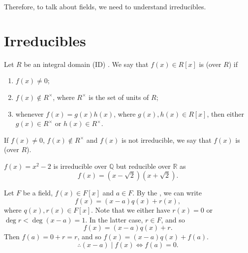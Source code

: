 \documentclass[notoc,notitlepage]{tufte-book}
\begin{document}
Therefore, to talk about fields, we need to understand irreducibles.


\section{Irreducibles}%
\label{sec:irreducibles}

\begin{defn}[Irreducible]\label{defn:irreducible}
  Let $R$ be an integral domain (ID) . We say that $f(x) \in R[x]$ is 
  (over $R$) if
  \begin{enumerate}
    \item $f(x) \neq 0$;
    \item $f(x) \notin R^\times$, where $R^\times$ is the set of units of $R$;
    \item whenever $f(x) = g(x) h(x)$, where $g(x), h(x) \in R[x]$, then either 
      $g(x) \in R^\times$ or $h(x) \in R^\times$.
  \end{enumerate}
  If $f(x) \neq 0$, $f(x) \notin R^\times$ and $f(x)$ is not irreducible, we say that
  $f(x)$ is  (over $R$).
\end{defn}

\begin{eg}
  $f(x) = x^2 - 2$ is irreducible over $\mathbb{Q}$ but reducible over $\mathbb{R}$ as
  \begin{equation*}
    f(x) = \left(x - \sqrt{2}\right)\left(x + \sqrt{2}\right).
  \end{equation*}
\end{eg}

Let $F$ be a field, $f(x) \in F[x]$ and $a \in F$. By the ,
we can write
\begin{equation*}
  f(x) = (x - a) q(x) + r(x),
\end{equation*}
where $q(x), r(x) \in F[x]$. Note that we either have $r(x) = 0$ or 
$\deg r < \deg (x - a) = 1$. In the latter case, $r \in F$, and so
\begin{equation*}
  f(x) = (x - a) q(x) + r.
\end{equation*}
Then $f(a) = 0 + r = r$, and so $f(x) = (x - a) q(x) + f(a)$.
\begin{equation*}
  \therefore (x - a) \mid f(x) \iff f(a) = 0.
\end{equation*}
\end{document}
